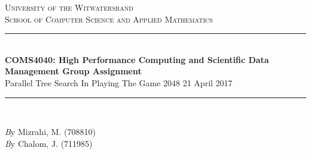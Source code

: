 \documentclass[11pt]{article}
\begin{document}
\begin{page}
\thispagestyle{empty}

\newcommand{\HRule}{\rule{\linewidth}{0.3mm}} %
\renewcommand\section{\@startsection{section}{1}{\z@}%
                                  {-3.5ex \@plus -1ex \@minus -.2ex}%
                                  {2.3ex \@plus.2ex}%
                                  {\normalfont\large\bfseries}}
\setlength{\parindent}{0pt}

\center %
 

\textsc{\LARGE University of the Witwatersrand}\\[1.5cm] %
\textsc{\Large School of Computer Science and Applied Mathematics}\\[0.5cm] %


\HRule \\[0.4cm]
{ \huge \bfseries COMS4040: High Performance Computing and Scientific Data Management Group Assignment}\\[0.4cm] %
  \larger Parallel Tree Search In Playing The Game 2048
  \large 21 April 2017
\HRule \\[1.5cm]
 
\begin{minipage}{1\textwidth}
  \Large \emph By Mizrahi, M. (708810)\\
  \Large \emph By Chalom, J. (711985)\\
\end{minipage}


\vfill %

\end{page}
\end{document}
